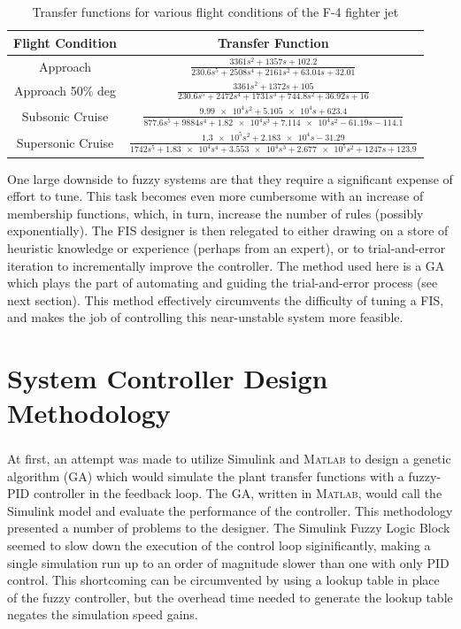 {
\renewcommand*{\arraystretch}{3}
\begin{table}
    \centering
    \caption{Transfer functions for various flight conditions of the F-4 fighter jet}\label{t:f4eoms}
    \begin{tabular}{|c|c|}\hline
        \textbf{Flight Condition}                                     & \textbf{Transfer Function}\\\hline
     Approach                                                & $\displaystyle\frac{3361s^2 + 1357s + 102.2}{230.6s^5 +
     2508s^4+2161s^2 + 63.04s + 32.01}$\\\hline
     Approach 50\% deg & $\displaystyle\frac{3361 s^2 + 1372s + 105}{230.6s^5 +
     2472s^4 + 1731s^3 + 744.8s^2 + 36.92s + 16}$\\\hline
     Subsonic Cruise                                         & $\displaystyle\frac{\num{9.99e4}s^2 + \num{5.105e4}s +
     623.4}{877.6s^5 + 9884s^4 + \num{1.82e4}s^3 + \num{7.114e4}s^2 - 61.19s - 114.1}$\\\hline
     Supersonic Cruise                                       & $\displaystyle\frac{\num{1.3e5}s^2 + \num{2.183e4}s -
     31.29}{1742s^5 + \num{1.83e4}s^4 + \num{3.553e4}s^3 + \num{2.677e5}s^2 + 1247s + 123.9}$\\\hline
\end{tabular}
\end{table}
}

One large downside to fuzzy systems are that they require a significant expense of effort to tune. This task
becomes even more cumbersome with an increase of membership functions, which, in turn, increase the number of
rules (possibly exponentially). The FIS designer is then relegated to either drawing on a store of heuristic
knowledge or experience (perhaps from an expert), or to trial-and-error iteration to incrementally improve the
controller. The method used here is a GA which plays the part of automating and guiding the
trial-and-error process (see next section). This method effectively circumvents the difficulty of tuning a FIS,
and makes the job of controlling this near-unstable system more feasible.

\section{System Controller Design Methodology} At first, an attempt was made to utilize
Simulink\textsuperscript{\textregistered} and \textsc{Matlab}\textsuperscript{\textregistered} to design a
genetic algorithm (GA) which would simulate the plant transfer functions with a fuzzy-PID controller in the
feedback loop. The GA, written in \textsc{Matlab}, would call the Simulink model and evaluate the performance
of the controller. This methodology presented a number of problems to the designer. The Simulink Fuzzy Logic
Block seemed to slow down the execution of the control loop siginificantly, making a single simulation run up
to an order of magnitude slower than one with only PID control. This shortcoming can be circumvented by using
a lookup table in place of the fuzzy controller, but the overhead time needed to generate the lookup table
negates the simulation speed gains.

